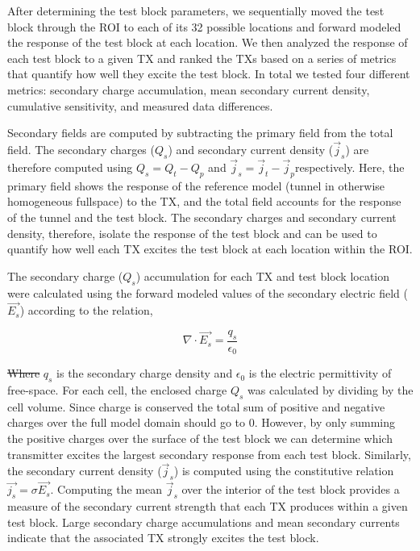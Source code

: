 \documentclass[preprint,authoryear,12pt]{elsarticle}
\providecommand{\DIFaddtex}[1]{{\protect\color{blue}\uwave{#1}}} %
\providecommand{\DIFdeltex}[1]{{\protect\color{red}\sout{#1}}}                      %
\providecommand{\DIFaddbegin}{} %
\providecommand{\DIFaddend}{} %
\providecommand{\DIFdelbegin}{} %
\providecommand{\DIFdelend}{} %
\providecommand{\DIFadd}[1]{\texorpdfstring{\DIFaddtex{#1}}{#1}} %
\providecommand{\DIFdel}[1]{\texorpdfstring{\DIFdeltex{#1}}{}} %
\begin{document}
After determining the test block parameters, we sequentially moved the test block through the ROI to each of its 32 possible locations and forward modeled the response of the test block at each location. We then analyzed the response of each test block to a given TX and ranked the TXs based on a series of metrics that quantify how well they excite the test block. In total we tested four different metrics: secondary charge accumulation, mean secondary current density, cumulative sensitivity, and measured data differences.

Secondary fields are computed by subtracting the primary field from the total field. The secondary charges ($Q_s$) and secondary current density ($\vec{j}_s$) are therefore computed using $Q_s  = Q_t - Q_p$ and $\vec{j}_s  = \vec{j}_t - \vec{j}_p$\DIFaddbegin \DIFadd{, }\DIFaddend respectively. Here, the primary field shows the response of the reference model (tunnel in otherwise homogeneous fullspace) to the TX, and the total field accounts for the response of the tunnel and the test block.  The secondary charges and secondary current density, therefore, isolate the response of the test block and can be used to quantify how well each TX excites the test block at each location within the ROI.

The secondary charge ($Q_{s}$) accumulation for each TX and test block location were calculated using the forward modeled values of the secondary electric field ($\vec{E_{s}}$) according to the relation,

\begin{equation}
   \nabla \cdot \vec{E_{s}} = \frac{q_{s}}{\epsilon_0}
\label{eq:ChargeDensity}
\end{equation}

\DIFdelbegin \DIFdel{Where }\DIFdelend \DIFaddbegin \DIFadd{where }\DIFaddend $q_{s}$ is the secondary charge density and $\epsilon_0$ is the electric permittivity of free-space. For each cell, the enclosed charge $Q_{s}$ was calculated by dividing by the cell volume. Since charge is conserved the total sum of positive and negative charges over the full model domain should go to 0. However, by only summing the positive charges over the surface of the test block we can determine which transmitter excites the largest secondary response from each test block. Similarly, the secondary current density ($\vec{j}_s$) is computed using the constitutive relation $\vec{j_{s}} = \sigma \vec{E_{s}}$. Computing the mean $\vec{j}_s$ over the interior of the test block provides a measure of the secondary current strength that each TX produces within a given test block. Large secondary charge accumulations and mean secondary currents indicate that the associated TX strongly excites the test block.
\end{document}
